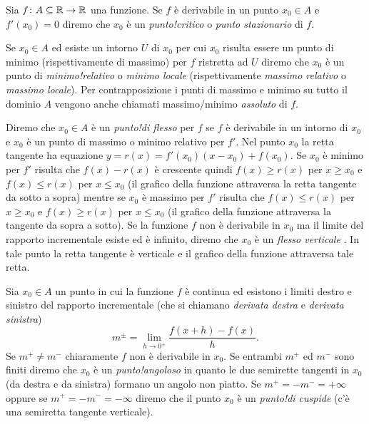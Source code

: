 \begin{definition}
Sia $f\colon A \subseteq {\mathbb R} \to {\mathbb R}$ una funzione. Se $f$ è derivabile in un
punto $x_0\in A$ e $f'(x_0) = 0$ diremo che $x_0$ è un \emph{punto!critico}%
%
o
\emph{punto stazionario}
di $f$.

Se $x_0\in A$ ed esiste un intorno $U$ di $x_0$ per cui $x_0$ risulta
essere un punto di minimo (rispettivamente di massimo) per $f$ ristretta ad $U$
diremo che $x_0$ è un punto di \emph{minimo!relativo}%
%
 o \emph{minimo locale}
(rispettivamente \emph{massimo relativo} o \emph{massimo locale}).
Per contrapposizione i punti di massimo e minimo su tutto il dominio $A$
vengono anche
chiamati massimo/minimo \emph{assoluto} di $f$.

Diremo che $x_0\in A$ è un \emph{punto!di flesso}%
%
 per $f$ se
$f$ è derivabile in un intorno di $x_0$ e $x_0$ è un punto di massimo
o minimo relativo per $f'$. Nel punto $x_0$ la retta tangente
ha equazione $y=r(x) = f'(x_0) (x-x_0) + f(x_0)$. Se $x_0$ è
minimo per $f'$ risulta che $f(x)-r(x)$ è crescente
quindi $f(x)\ge r(x)$ per $x\ge x_0$ e $f(x)\le r(x)$ per $x\le x_0$
(il grafico della funzione attraversa la retta tangente da sotto a sopra)
mentre se $x_0$ è massimo per $f'$ risulta che $f(x)\le r(x)$ per $x\ge x_0$
e $f(x) \ge r(x)$ per $x\le x_0$ (il grafico della funzione attraversa
la tangente da sopra a sotto).
Se la funzione $f$ non è derivabile in $x_0$ ma il limite del rapporto
incrementale esiste ed è infinito, diremo che $x_0$ è un
\emph{flesso verticale}%
%
. In tale punto la retta tangente è verticale
e il grafico della funzione attraversa tale retta.

Sia $x_0\in A$ un punto in cui la funzione $f$ è continua ed esistono
i limiti destro e sinistro del rapporto incrementale
(che si chiamano \emph{derivata destra} e \emph{derivata sinistra})
\[
  m^{\pm} = \lim_{h\to 0^\pm}\frac{f(x+h) - f(x)}{h}.
\]
Se $m^+ \neq m^-$ chiaramente $f$ non è derivabile in $x_0$.
Se entrambi $m^+$ ed $m^-$ sono finiti diremo che $x_0$ è un
\emph{punto!angoloso}%
%
 in quanto le due semirette tangenti
in $x_0$ (da destra e da sinistra) formano un angolo non piatto.
Se $m^+=-m^-=+\infty$ oppure se $m^+=-m^-=-\infty$
diremo che il punto $x_0$ è un \emph{punto!di cuspide}%
%
 (c'è una
semiretta tangente verticale).
\end{definition}

